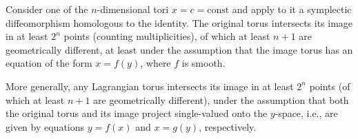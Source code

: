 Consider one of the $n$-dimensional tori $x = c = \text{const}$ and apply to it a symplectic diffeomorphism homologous to the identity. The original torus intersects its image in at least $2^n$ points (counting multiplicities), of which at least $n + 1$ are geometrically different, at least under the assumption that the image torus has an equation of the form $x = f(y)$, where $f$ is smooth.

More generally, any Lagrangian torus intersects its image in at least $2^n$ points (of which at least $n+1$ are geometrically different), under the assumption that both the original torus and its image project single-valued onto the $y$-space, i.e., are given by equations $y = f(x)$ and $x = g(y)$, respectively.
